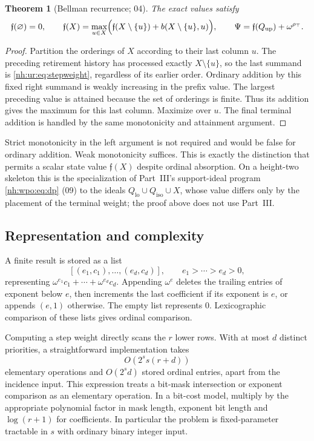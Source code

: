 \documentclass[11pt,a4paper]{article}
\newtheorem{theorem}{Theorem}[section]
\theoremstyle{definition}
\theoremstyle{remark}
\newcommand{\Qlo}{Q_{\mathrm{lo}}}
\newcommand{\Qup}{Q_{\mathrm{up}}}
\newcommand{\Qiso}{Q_{\mathrm{iso}}}
\newcommand{\rtop}{\rho_{\top}}
\begin{document}
\begin{theorem}[Bellman recurrence; 04]\label{nh:ur:thm:dp}
The exact values satisfy
\begin{equation}\label{nh:ur:eq:dp}
 \mathfrak f(\varnothing)=0,\qquad
 \mathfrak f(X)=\max_{u\in X}\Bigl(\mathfrak f(X\setminus\{u\})+b(X\setminus\{u\},u)\Bigr),
 \qquad \Psi=\mathfrak f(\Qup)+\omega^{\rtop}.
\end{equation}
\end{theorem}
\begin{proof}
Partition the orderings of $X$ according to their last column $u$. The
preceding retirement history has processed exactly $X\setminus\{u\}$, so the
last summand is \eqref{nh:ur:eq:stepweight}, regardless of its earlier order.
Ordinary addition by this fixed right summand is weakly increasing in the
prefix value. The largest preceding value is attained because the set of
orderings is finite. Thus its addition gives the maximum for this last column.
Maximize over $u$. The final terminal addition is handled by the same
monotonicity and attainment argument.
\end{proof}

Strict monotonicity in the left argument is not required and would be false
for ordinary addition. Weak monotonicity suffices. This is exactly the
distinction that permits a scalar state value $\mathfrak f(X)$ despite
ordinal absorption. On a height-two skeleton this is the specialization of
Part~III's support-ideal program \eqref{nh:wpo:eq:dp} (09) to the ideals
$\Qlo\cup\Qiso\cup X$, whose value differs only by the placement of the
terminal weight; the proof above does not use Part~III.

\subsection{Representation and complexity}
A finite result is stored as a list
\[
 [(e_1,c_1),\ldots,(e_d,c_d)],\qquad e_1>\cdots>e_d>0,
\]
representing $\omega^{e_1}c_1+\cdots+\omega^{e_d}c_d$. Appending $\omega^e$
deletes the trailing entries of exponent below $e$, then increments the last
coefficient if its exponent is $e$, or appends $(e,1)$ otherwise. The empty
list represents $0$. Lexicographic comparison of these lists gives ordinal
comparison.

Computing a step weight directly scans the $r$ lower rows. With at most $d$
distinct priorities, a straightforward implementation takes
\begin{equation}\label{nh:ur:eq:time}
 O\!\left(2^s s(r+d)\right)
\end{equation}
elementary operations and $O(2^s d)$ stored ordinal entries, apart from the
incidence input. This expression treats a bit-mask intersection or exponent
comparison as an elementary operation. In a bit-cost model, multiply by the
appropriate polynomial factor in mask length, exponent bit length and
$\log(r+1)$ for coefficients. In particular the problem is fixed-parameter
tractable in $s$ with ordinary binary integer input.
\end{document}
